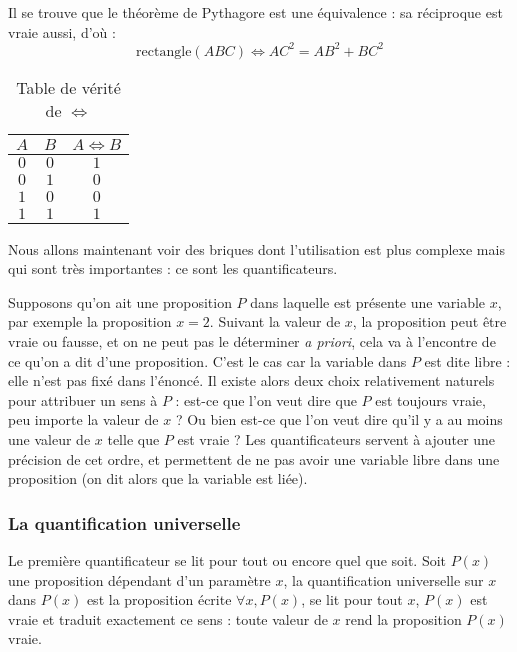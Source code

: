 \begin{expl}
    Il se trouve que le théorème de Pythagore est une équivalence : sa réciproque est vraie aussi, d'où : $$\mathrm{rectangle}(ABC) \iff AC^2=AB^2+BC^2$$
\end{expl}

\begin{table}[h]
            \centering
            \begin{tabular}{| c | c | c |}
                \hline
                $A$ & $B$ & $A\iff B$\\
                \hline
                $0$ & $0$ & $1$\\
                $0$ & $1$ & $0$\\
                $1$ & $0$ & $0$\\
                $1$ & $1$ & $1$\\
                \hline
            \end{tabular}
            \caption{Table de vérité de $\iff$}
    \end{table}

Nous allons maintenant voir des briques dont l'utilisation est plus complexe mais qui sont très importantes : ce sont les quantificateurs.

Supposons qu'on ait une proposition $P$ dans laquelle est présente une variable $x$, par exemple la proposition $x=2$. Suivant la valeur de $x$, la proposition peut être vraie ou fausse, et on ne peut pas le déterminer \textit{a priori}, cela va à l'encontre de ce qu'on a dit d'une proposition. C'est le cas car la variable dans $P$ est dite libre : elle n'est pas fixé dans l'énoncé. Il existe alors deux choix relativement naturels pour attribuer un sens à $P$ : est-ce que l'on veut dire que $P$ est toujours vraie, peu importe la valeur de $x$ ? Ou bien est-ce que l'on veut dire qu'il y a au moins une valeur de $x$ telle que $P$ est vraie ? Les quantificateurs servent à ajouter une précision de cet ordre, et permettent de ne pas avoir une variable libre dans une proposition (on dit alors que la variable est liée).

\subsubsection{La quantification universelle}

Le première quantificateur se lit \og pour tout\fg{} ou encore \og quel que soit\fg{}. Soit $P(x)$ une proposition dépendant d'un paramètre $x$, la quantification universelle sur $x$ dans $P(x)$ est la proposition écrite $\forall x, P(x)$, se lit \og pour tout $x$, $P(x)$ est vraie\fg{} et traduit exactement ce sens : toute valeur de $x$ rend la proposition $P(x)$ vraie.

